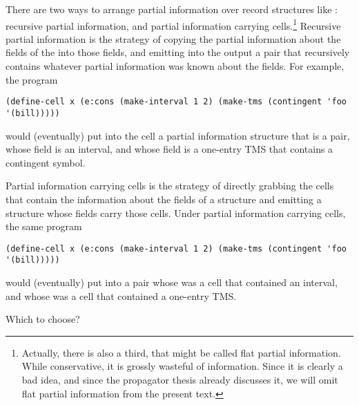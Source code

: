 \documentclass[12pt,letterpaper]{article}
\begin{document}
There are two ways to arrange partial information over record
structures like : recursive partial information, and
partial information carrying cells.\footnote{Actually, there is also a
  third, that might be called flat partial information.  While
  conservative, it is grossly wasteful of information.  Since it is
  clearly a bad idea, and since the propagator thesis already
  discusses it, we will omit flat partial information from the present
  text.}  Recursive partial information is the strategy of copying the
partial information about the fields of the  into those
fields, and emitting into the output a pair that recursively contains
whatever partial information was known about the fields.  For example,
the program
\begin{verbatim}
(define-cell x (e:cons (make-interval 1 2) (make-tms (contingent 'foo '(bill)))))
\end{verbatim}
would (eventually) put into the cell  a partial information
structure that is a pair, whose  field is an interval, and
whose  field is a one-entry TMS that contains a contingent
symbol.

Partial information carrying cells is the strategy of directly
grabbing the cells that contain the information about the fields of a
structure and emitting a structure whose fields carry those cells.
Under partial information carrying cells, the same program
\begin{verbatim}
(define-cell x (e:cons (make-interval 1 2) (make-tms (contingent 'foo '(bill)))))
\end{verbatim}
would (eventually) put into  a pair whose  was a
cell that contained an interval, and whose  was a cell that
contained a one-entry TMS.

Which to choose?
\end{document}
